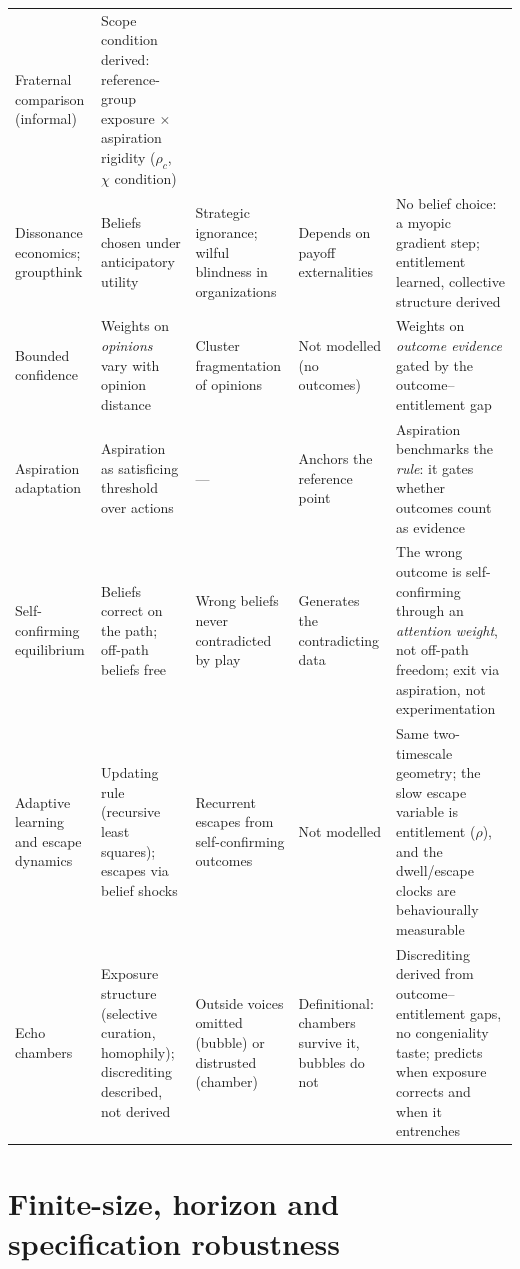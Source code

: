 \documentclass[11pt]{article}
\newcommand{\1}{\mathbf{1}}
\begin{document}
\begin{table}[H]
\begin{tabular}{@{}p{3.0cm}p{2.8cm}p{3.1cm}p{2.6cm}p{2.9cm}@{}}
Fraternal comparison (informal) &
Scope condition derived: reference-group exposure $\times$ aspiration rigidity ($\rho_c$, $\chi$ condition) \\
\addlinespace
Dissonance economics; groupthink\cite{AkerlofDickens1982,Rabin1994,Benabou2013} &
Beliefs chosen under anticipatory utility &
Strategic ignorance; wilful blindness in organizations &
Depends on payoff externalities &
No belief choice: a myopic gradient step; entitlement learned, collective structure derived \\
\addlinespace
Bounded confidence\cite{HegselmannKrause2002} &
Weights on \emph{opinions} vary with opinion distance &
Cluster fragmentation of opinions &
Not modelled (no outcomes) &
Weights on \emph{outcome evidence} gated by the outcome--entitlement gap \\
\addlinespace
Aspiration adaptation\cite{Simon1955,Selten1998,KoszegiRabin2006} &
Aspiration as satisficing threshold over actions &
--- &
Anchors the reference point &
Aspiration benchmarks the \emph{rule}: it gates whether outcomes count as evidence \\
\addlinespace
Self-confirming equilibrium\cite{FudenbergLevine1993,EspondaPouzo2016} &
Beliefs correct on the path; off-path beliefs free &
Wrong beliefs never contradicted by play &
Generates the contradicting data &
The wrong outcome is self-confirming through an \emph{attention weight}, not off-path freedom; exit via aspiration, not experimentation \\
\addlinespace
Adaptive learning and escape dynamics\cite{EvansHonkapohja2001,ChoWilliamsSargent2002} &
Updating rule (recursive least squares); escapes via belief shocks &
Recurrent escapes from self-confirming outcomes &
Not modelled &
Same two-timescale geometry; the slow escape variable is entitlement ($\rho$), and the dwell/escape clocks are behaviourally measurable \\
\addlinespace
Echo chambers\cite{Nguyen2020,Cinelli2021,Bail2018} &
Exposure structure (selective curation, homophily); discrediting described, not derived &
Outside voices omitted (bubble) or distrusted (chamber) &
Definitional: chambers survive it, bubbles do not &
Discrediting derived from outcome--entitlement gaps, no congeniality taste; predicts when exposure corrects and when it entrenches \\
\bottomrule
\end{tabular}
\end{table}

\section{Finite-size, horizon and specification robustness}
\label{s:robust}
\end{document}
